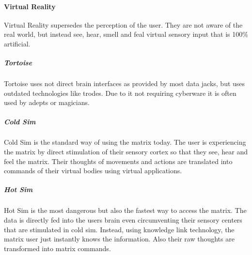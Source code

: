 \paragraph{Virtual Reality}
Virtual Reality supersedes the perception of the user. They are not aware of the real world, but
instead see, hear, smell and feal virtual sensory input that is 100\% artificial.

\subparagraph{Tortoise}
Tortoise uses not direct brain interfaces as provided by most data jacks, but uses
outdated technologies like trodes. Due to it not requiring cyberware it is often
used by adepts or magicians.

\subparagraph{Cold Sim}
Cold Sim is the standard way of using the matrix today. The user is experiencing
the matrix by direct stimulation of their sensory cortex so that they see, hear
and feel the matrix. Their thoughts of movements and actions are translated into
commands of their virtual bodies using virtual applications.

\subparagraph{Hot Sim}
Hot Sim is the most dangerous but also the fastest way to access the matrix.
The data is directly fed into the users brain even circumventing their sensory
centers that are stimulated in cold sim. Instead, using knowledge link technology,
the matrix user just instantly knows the information. Also their raw thoughts
are transformed into matrix commands.


